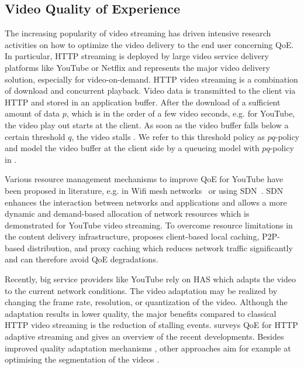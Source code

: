 \subsection{Video Quality of Experience}\label{sec:application:background:application_qoe}
The increasing popularity of video streaming has driven intensive research activities on how to optimize the video delivery to the end user concerning \gls{QoE}.
In particular, \gls{HTTP} streaming is deployed by large video service delivery platforms like YouTube or Netflix and represents the major video delivery solution, especially for video-on-demand.
\gls{HTTP} video streaming is a combination of download and concurrent playback.
Video data is transmitted to the client via \gls{HTTP} and stored in an application buffer.
After the download of a sufficient amount of data \(p\), which is in the order of a few video seconds, e.g. for YouTube, the video play out starts at the client.
As soon as the video buffer falls below a certain threshold \(q\), the video stalls \cite{Hossfeld2013c}.
We refer to this threshold policy as \(pq\)-policy and model the video buffer at the client side by a queueing model with \(pq\)-policy in .

Various resource management mechanisms to improve \gls{QoE} for YouTube have been proposed in literature, e.g. in Wifi mesh networks~\cite{Wamser2013} or using \gls{SDN}~\cite{Zinner2014}. \gls{SDN} enhances the interaction between networks and applications and allows a more dynamic and demand-based allocation of network resources which is demonstrated for YouTube video streaming.
To overcome resource limitations in the content delivery infrastructure, \cite{Zink2008} proposes client-based local caching, \gls{P2P}-based distribution, and proxy caching which reduces network traffic significantly and can therefore avoid \gls{QoE} degradations. 

Recently, big service providers like YouTube rely on \gls{HAS} which adapts the video to the current network conditions. The video adaptation may be realized by changing the frame rate, resolution, or quantization of the video. Although the adaptation results in lower quality, the major benefits compared to classical \gls{HTTP} video streaming is the reduction of stalling events.
\cite{Seufert2014} surveys \gls{QoE} for \gls{HTTP} adaptive streaming and gives an overview of the recent developments. 
Besides improved quality adaptation mechanisms \cite{Sieber2013}, other approaches aim for example at optimising the segmentation of the videos \cite{Lievens2013}.

